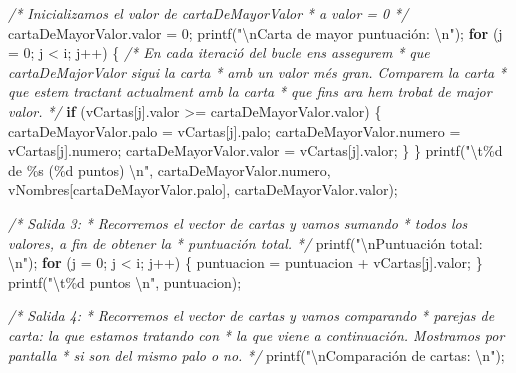 \documentclass[
]{book}
\newenvironment{Shaded}{\begin{snugshade}}{\end{snugshade}}
\newcommand{\CommentTok}[1]{\textcolor[rgb]{0.56,0.35,0.01}{\textit{#1}}}
\newcommand{\ControlFlowTok}[1]{\textcolor[rgb]{0.13,0.29,0.53}{\textbf{#1}}}
\newcommand{\DecValTok}[1]{\textcolor[rgb]{0.00,0.00,0.81}{#1}}
\newcommand{\NormalTok}[1]{#1}
\newcommand{\SpecialCharTok}[1]{\textcolor[rgb]{0.00,0.00,0.00}{#1}}
\newcommand{\StringTok}[1]{\textcolor[rgb]{0.31,0.60,0.02}{#1}}
\begin{document}
\begin{Shaded}
\begin{Highlighting}[]
    \CommentTok{/* Inicializamos el valor de cartaDeMayorValor}
\CommentTok{     * a valor = 0}
\CommentTok{     */}
\NormalTok{    cartaDeMayorValor.valor = }\DecValTok{0}\NormalTok{;}
\NormalTok{    printf(}\StringTok{"}\SpecialCharTok{\textbackslash{}n}\StringTok{Carta de mayor puntuación: }\SpecialCharTok{\textbackslash{}n}\StringTok{"}\NormalTok{);}
    \ControlFlowTok{for}\NormalTok{ (j = }\DecValTok{0}\NormalTok{; j \textless{} i; j++) \{}
        \CommentTok{/* En cada iteració del bucle ens assegurem}
\CommentTok{         * que cartaDeMajorValor sigui la carta}
\CommentTok{         * amb un valor més gran. Comparem la carta}
\CommentTok{         * que estem tractant actualment amb la carta}
\CommentTok{         * que fins ara hem trobat de major valor.}
\CommentTok{         */}
        \ControlFlowTok{if}\NormalTok{ (vCartas[j].valor \textgreater{}= cartaDeMayorValor.valor) \{}
\NormalTok{            cartaDeMayorValor.palo = vCartas[j].palo;}
\NormalTok{            cartaDeMayorValor.numero = vCartas[j].numero;}
\NormalTok{            cartaDeMayorValor.valor = vCartas[j].valor;}
\NormalTok{        \}}
\NormalTok{    \}}
\NormalTok{    printf(}\StringTok{"}\SpecialCharTok{\textbackslash{}t}\StringTok{\%d de \%s (\%d puntos) }\SpecialCharTok{\textbackslash{}n}\StringTok{"}\NormalTok{, cartaDeMayorValor.numero, vNombres[cartaDeMayorValor.palo], cartaDeMayorValor.valor);}

    \CommentTok{/* Salida 3:}
\CommentTok{     * Recorremos el vector de cartas y vamos sumando}
\CommentTok{     * todos los valores, a fin de obtener la}
\CommentTok{     * puntuación total.}
\CommentTok{     */}
\NormalTok{    printf(}\StringTok{"}\SpecialCharTok{\textbackslash{}n}\StringTok{Puntuación total: }\SpecialCharTok{\textbackslash{}n}\StringTok{"}\NormalTok{);}
    \ControlFlowTok{for}\NormalTok{ (j = }\DecValTok{0}\NormalTok{; j \textless{} i; j++) \{}
\NormalTok{        puntuacion = puntuacion + vCartas[j].valor;}
\NormalTok{    \}}
\NormalTok{    printf(}\StringTok{"}\SpecialCharTok{\textbackslash{}t}\StringTok{\%d puntos }\SpecialCharTok{\textbackslash{}n}\StringTok{"}\NormalTok{, puntuacion);}
    
    \CommentTok{/* Salida 4:}
\CommentTok{     * Recorremos el vector de cartas y vamos comparando}
\CommentTok{     * parejas de carta: la que estamos tratando con}
\CommentTok{     * la que viene a continuación. Mostramos por pantalla}
\CommentTok{     * si son del mismo palo o no.}
\CommentTok{     */}
\NormalTok{    printf(}\StringTok{"}\SpecialCharTok{\textbackslash{}n}\StringTok{Comparación de cartas: }\SpecialCharTok{\textbackslash{}n}\StringTok{"}\NormalTok{);}
    

\end{Highlighting}
\end{Shaded}
\end{document}
